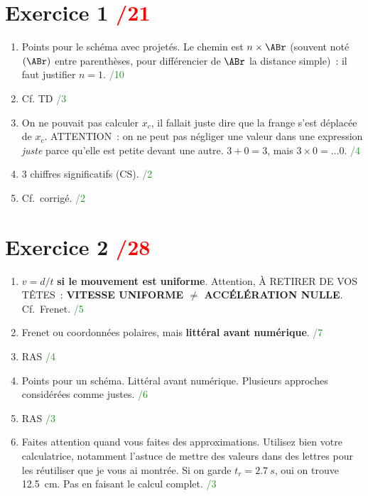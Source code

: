 \documentclass[a4paper, 10pt, final, garamond]{book}
\begin{document}
\begin{multicols}{2}
\section{Exercice 1 \hfill \textcolor{red}{/21}}
\begin{enumerate}
    \item Points pour le schéma avec projetés. Le chemin est $n\times\ABr$ 
        (souvent noté $(\ABr)$ entre parenthèses, pour différencier de $\ABr$ la
        distance simple)~: il faut justifier $n=1$. \hfill
        \textcolor{ForestGreen}{/10}
    \item Cf. TD \hfill \textcolor{ForestGreen}{/3}
    \item On ne pouvait pas calculer $x_c$, il fallait juste dire que la frange
        s'est déplacée de $x_c$. ATTENTION~: on ne peut pas négliger une valeur
        dans une expression \textit{juste} parce qu'elle est petite devant une
        autre. $3+0 = 3$, mais $3\times0 = … 0$. \hfill
        \textcolor{ForestGreen}{/4}
    \item 3 chiffres significatifs (CS). \hfill \textcolor{ForestGreen}{/2}
    \item Cf.\ corrigé. \hfill \textcolor{ForestGreen}{/2}
\end{enumerate}
\vspace*{\fill}

\columnbreak
\section{Exercice 2 \hfill \textcolor{red}{/28}}

\begin{enumerate}
    \item $v = d/t$ \textbf{si le mouvement est uniforme}. Attention, À RETIRER
        DE VOS TÊTES~: \textbf{VITESSE UNIFORME $\neq$ ACCÉLÉRATION NULLE}. Cf.\
        Frenet. \hfill \textcolor{ForestGreen}{/5}
    \item Frenet ou coordonnées polaires, mais \textbf{littéral avant
        numérique}. \hfill \textcolor{ForestGreen}{/7}
    \item RAS \hfill \textcolor{ForestGreen}{/4}
    \item Points pour un schéma. Littéral avant numérique. Plusieurs approches
        considérées comme justes. \hfill \textcolor{ForestGreen}{/6}
    \item RAS \hfill \textcolor{ForestGreen}{/3}
    \item Faites attention quand vous faites des approximations. Utilisez bien
        votre calculatrice, notamment l'astuce de mettre des valeurs dans
        des lettres pour les réutiliser que je vous ai montrée. Si on garde $t_r
        = \SI{2.7}{s}$, oui on trouve \SI{12.5}{cm}. Pas en faisant le calcul
        complet. \hfill \textcolor{ForestGreen}{/3}
\end{enumerate}
\end{multicols}
\end{document}
